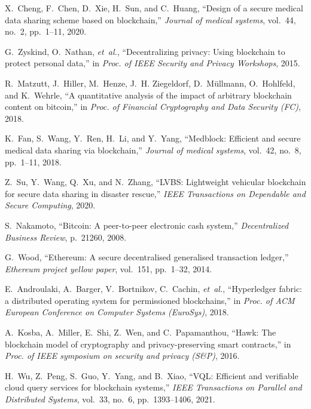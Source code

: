 \documentclass[11pt,divpdfm]{article}
\begin{document}
\begin{thebibliography}{10}
X.~Cheng, F.~Chen, D.~Xie, H.~Sun, and C.~Huang, ``Design of a secure medical
  data sharing scheme based on blockchain,'' {\em Journal of medical systems},
  vol.~44, no.~2, pp.~1--11, 2020.

G.~Zyskind, O.~Nathan, {\em et~al.}, ``Decentralizing privacy: Using blockchain
  to protect personal data,'' in {\em Proc. of IEEE Security and Privacy
  Workshops}, 2015.

R.~Matzutt, J.~Hiller, M.~Henze, J.~H. Ziegeldorf, D.~M{\"u}llmann,
  O.~Hohlfeld, and K.~Wehrle, ``A quantitative analysis of the impact of
  arbitrary blockchain content on bitcoin,'' in {\em Proc. of Financial
  Cryptography and Data Security (FC)}, 2018.

K.~Fan, S.~Wang, Y.~Ren, H.~Li, and Y.~Yang, ``{Medblock}: Efficient and secure
  medical data sharing via blockchain,'' {\em Journal of medical systems},
  vol.~42, no.~8, pp.~1--11, 2018.

Z.~Su, Y.~Wang, Q.~Xu, and N.~Zhang, ``{LVBS}: Lightweight vehicular blockchain
  for secure data sharing in disaster rescue,'' {\em IEEE Transactions on
  Dependable and Secure Computing}, 2020.

S.~Nakamoto, ``Bitcoin: A peer-to-peer electronic cash system,'' {\em
  Decentralized Business Review}, p.~21260, 2008.

G.~Wood, ``Ethereum: A secure decentralised generalised transaction ledger,''
  {\em Ethereum project yellow paper}, vol.~151, pp.~1--32, 2014.

E.~Androulaki, A.~Barger, V.~Bortnikov, C.~Cachin, {\em et~al.}, ``Hyperledger
  fabric: a distributed operating system for permissioned blockchains,'' in
  {\em Proc. of ACM European Conference on Computer Systems (EuroSys)}, 2018.

A.~Kosba, A.~Miller, E.~Shi, Z.~Wen, and C.~Papamanthou, ``Hawk: The blockchain
  model of cryptography and privacy-preserving smart contracts,'' in {\em Proc.
  of IEEE symposium on security and privacy (S\&P)}, 2016.

H.~Wu, Z.~Peng, S.~Guo, Y.~Yang, and B.~Xiao, ``{VQL}: Efficient and verifiable
  cloud query services for blockchain systems,'' {\em IEEE Transactions on
  Parallel and Distributed Systems}, vol.~33, no.~6, pp.~1393--1406, 2021.


\end{thebibliography}
\end{document}
